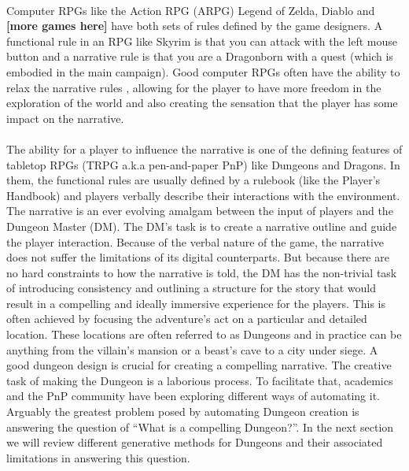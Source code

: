 \documentclass{UoYCSproject}
\begin{document}
\paragraph{}
Computer RPGs like the Action RPG (ARPG) Legend of Zelda, Diablo and \textbf{[more games here]} have both sets of rules defined by the game designers. A functional rule in an RPG like Skyrim is that you can attack with the left mouse button and a narrative rule is that you are a Dragonborn with a quest (which is embodied in the main campaign). Good computer RPGs often have the ability to relax the narrative rules \parencite{TychsenGM}, allowing for the player to have more freedom in the exploration of the world and also creating the sensation that the player has some impact on the narrative.

\paragraph{}
The ability for a player to influence the narrative is one of the defining features of tabletop RPGs (TRPG a.k.a pen-and-paper PnP) like Dungeons and Dragons. In them, the functional rules are usually defined by a rulebook (like the Player’s Handbook) and players verbally describe their interactions with the environment. The narrative is an ever evolving amalgam between the input of players and the Dungeon Master (DM). The DM’s task is to create a narrative outline and guide the player interaction. Because of the verbal nature of the game, the narrative does not suffer the limitations of its digital counterparts. But because there are no hard constraints to how the narrative is told, the DM has the non-trivial task of introducing consistency and outlining a structure for the story that would result in a compelling and ideally immersive experience for the players. This is often achieved by focusing the adventure’s act on a particular and detailed location. These locations are often referred to as Dungeons and in practice can be anything from the villain's mansion or a beast’s cave to a city under siege. A good dungeon design is crucial for creating a compelling narrative. The creative task of making the Dungeon is a laborious process. To facilitate that, academics and the PnP community have been exploring different ways of automating it. Arguably the greatest problem posed by automating Dungeon creation is answering the question of “What is a compelling Dungeon?”. In the next section we will review different generative methods for Dungeons and their associated limitations in answering this question.
\end{document}
